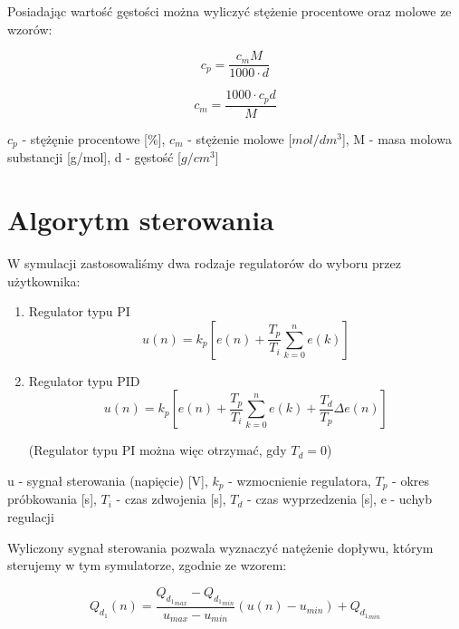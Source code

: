 \documentclass[polish,polish,a4paper,12pt]{article}
\begin{document}
	Posiadając wartość gęstości można wyliczyć stężenie procentowe oraz molowe ze wzorów:
	
	\begin{equation*}
		c_p = \frac{c_mM}{1000 \cdot d}
	\end{equation*}

	\begin{equation*}
		c_m = \frac{1000 \cdot c_p d}{M}
	\end{equation*}

	{\small $c_p$ - stężęnie procentowe [\%], \hspace{1em} $c_m$ - stężenie molowe [$mol/dm^3$], \hspace{1em} M - masa molowa substancji [g/mol], \hspace{1em} d - gęstość [$g/cm^3$]}

	\section{Algorytm sterowania}
	
	W symulacji zastosowaliśmy dwa rodzaje regulatorów do wyboru przez użytkownika:
	
	\begin{enumerate}
		\item Regulator typu PI
		\begin{equation*}
			u(n) = k_p\left[e(n) + \frac{T_p}{T_i}\sum_{k=0}^{n}e(k)\right]
		\end{equation*}
		\item Regulator typu PID
		\begin{equation*}
			u(n) = k_p\left[e(n) + \frac{T_p}{T_i}\sum_{k=0}^{n}e(k) + \frac{T_d}{T_p}\Delta e(n)\right]
		\end{equation*}
		\begin{center}
			\small(Regulator typu PI można więc otrzymać, gdy $T_d = 0$)
		\end{center}
	\end{enumerate}

	\small{u - sygnał sterowania (napięcie) [V], $k_p$ - wzmocnienie regulatora, $T_p$ - okres próbkowania [s], $T_i$ - czas zdwojenia [s], $T_d$ - czas wyprzedzenia [s], e - uchyb regulacji}
	
	Wyliczony sygnał sterowania pozwala wyznaczyć natężenie dopływu, którym sterujemy w tym symulatorze, zgodnie ze wzorem:
	
	\begin{equation*}
		Q_{d_{1}}(n) = \frac{Q_{{d_{1}}_{max}} - Q_{{d_{1}}_{min}}}{u_{max} - u_{min}}\left(u(n) - u_{min}\right) + Q_{{d_{1}}_{min}}
	\end{equation*}
\end{document}
